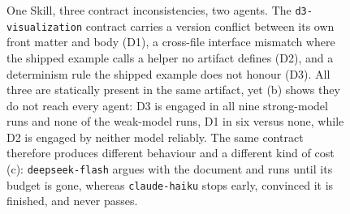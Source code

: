 \begin{figure}[t]

  \caption{One Skill, three contract inconsistencies, two agents. The
    \texttt{d3-visualization} contract carries a version conflict between its own
    front matter and body (D1), a cross-file interface mismatch where the shipped
    example calls a helper no artifact defines (D2), and a determinism rule the
    shipped example does not honour (D3). All three are statically present in the
    same artifact, yet (b) shows they do not reach every agent: D3 is engaged in
    all nine strong-model runs and none of the weak-model runs, D1 in six versus
    none, while D2 is engaged by neither model reliably. The same contract
    therefore produces different behaviour and a different kind of cost (c):
    \texttt{deepseek-flash} argues with the document and runs until its budget is
    gone, whereas \texttt{claude-haiku} stops early, convinced it is finished,
    and never passes.}
  \label{fig:motivation}
\end{figure}
